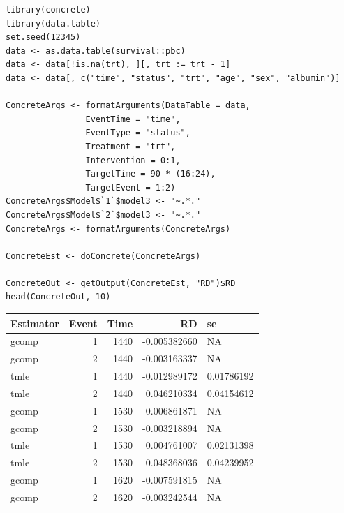 \documentclass{report}
\newcommand{\1}{\ensuremath{\mathbf{1}}}
\begin{document}
\begin{lstlisting}
library(concrete)
library(data.table)
set.seed(12345)
data <- as.data.table(survival::pbc)
data <- data[!is.na(trt), ][, trt := trt - 1]
data <- data[, c("time", "status", "trt", "age", "sex", "albumin")]

ConcreteArgs <- formatArguments(DataTable = data,
				EventTime = "time",
				EventType = "status",
				Treatment = "trt",
				Intervention = 0:1,
				TargetTime = 90 * (16:24),
				TargetEvent = 1:2)
ConcreteArgs$Model$`1`$model3 <- "~.*."
ConcreteArgs$Model$`2`$model3 <- "~.*."
ConcreteArgs <- formatArguments(ConcreteArgs)

ConcreteEst <- doConcrete(ConcreteArgs)

ConcreteOut <- getOutput(ConcreteEst, "RD")$RD
head(ConcreteOut, 10)
\end{lstlisting}

\begin{center}
\begin{tabular}{lrrrl}
Estimator & Event & Time & RD & se\\
\hline
gcomp & 1 & 1440 & -0.005382660 & NA\\
gcomp & 2 & 1440 & -0.003163337 & NA\\
tmle & 1 & 1440 & -0.012989172 & 0.01786192\\
tmle & 2 & 1440 & 0.046210334 & 0.04154612\\
gcomp & 1 & 1530 & -0.006861871 & NA\\
gcomp & 2 & 1530 & -0.003218894 & NA\\
tmle & 1 & 1530 & 0.004761007 & 0.02131398\\
tmle & 2 & 1530 & 0.048368036 & 0.04239952\\
gcomp & 1 & 1620 & -0.007591815 & NA\\
gcomp & 2 & 1620 & -0.003242544 & NA\\
\end{tabular}
\end{center}
\end{document}
